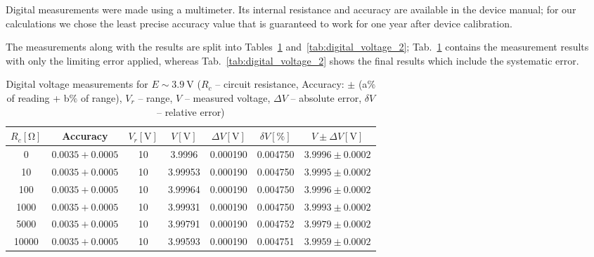 Digital measurements were made using a multimeter. Its internal resistance and accuracy are available in the device manual; for our calculations we chose the least precise accuracy value that is guaranteed to work for one year after device calibration.

 The measurements along with the results are split into Tables~\ref{tab:digital_voltage_1} and~\ref{tab:digital_voltage_2}; Tab.~\ref{tab:digital_voltage_1} contains the measurement results with only the limiting error applied, whereas Tab.~\ref{tab:digital_voltage_2} shows the final results which include the systematic error.

\begin{table}[H]
	\centering
	\begin{tabular}{ c | c |  c | c | c | c | c}
		$R_c [\unit{\ohm}]$  & Accuracy & $V_r [\unit{\volt}]$ & $V [\unit{\volt}]$ & $\Delta V [\unit{\volt}]$ & $\delta V [\unit{\percent}]$ & $V \pm \Delta V [\unit{\volt}]$ \\
		\hline
		0  & $0.0035 + 0.0005$ & 10 & 3.9996 & 0.000190 & 0.004750 & $3.9996 \pm 0.0002$\\
		\hline
		10  & $0.0035 + 0.0005$  & 10 & 3.99953 & 0.000190 & 0.004750 & $3.9995 \pm 0.0002$\\
		\hline
		100  & $0.0035 + 0.0005$  & 10 & 3.99964 & 0.000190 & 0.004750 & $3.9996 \pm 0.0002$\\
		\hline
		1000 &$0.0035 + 0.0005$  & 10 & 3.99931 & 0.000190 & 0.004750 & $3.9993 \pm 0.0002$\\
		\hline
		5000  & $0.0035 + 0.0005$  & 10 & 3.99791 & 0.000190 & 0.004752 & $3.9979 \pm 0.0002$\\
		\hline
		10000 & $0.0035 + 0.0005$  & 10 & 3.99593 & 0.000190 & 0.004751 & $3.9959 \pm 0.0002$\\
	\end{tabular}
	\caption{Digital voltage measurements for $E \sim \SI{3.9}{\volt}$ ($R_c$ -- circuit resistance, Accuracy: $\pm$ (a$\unit{\percent}$ of reading + b$\unit{\percent}$ of range), $V_r$ -- range, $V$ -- measured voltage, $\Delta V$ -- absolute error, $\delta V$ -- relative error)}
	\label{tab:digital_voltage_1}
\end{table}

